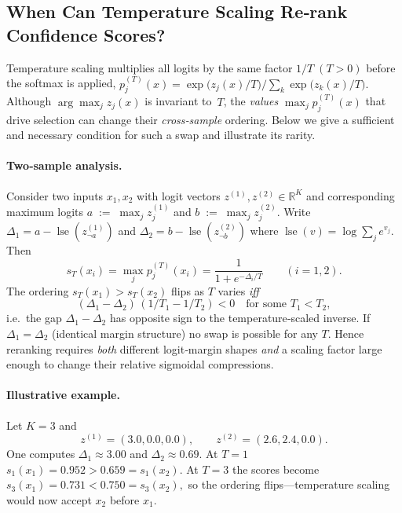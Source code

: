 \subsection{When Can Temperature Scaling Re‑rank Confidence Scores?}
\label{app:ts-rerank}

Temperature scaling multiplies all logits by the same factor
\(1/T\;(T>0)\) before the softmax is applied,
\(
p^{(T)}_j(x)=
\exp\bigl(z_j(x)/T\bigr)\bigl/\sum_k \exp\bigl(z_k(x)/T\bigr).
\)
Although \(\arg\max_j z_j(x)\) is invariant to~\(T\), the \emph{values}
\(\max_j p^{(T)}_j(x)\) that drive selection can change their
\emph{cross‑sample} ordering.  Below we give a sufficient and necessary
condition for such a swap and illustrate its rarity.

\paragraph{Two‑sample analysis.}
Consider two inputs \(x_1,x_2\) with logit vectors
\(z^{(1)},z^{(2)}\in\mathbb{R}^K\) and corresponding maximum logits
\(a\;{:=}\;\max_j z^{(1)}_j\) and \(b\;{:=}\;\max_j z^{(2)}_j\).
Write
\(\Delta_1=a-\operatorname*{lse}(z^{(1)}_{\neg a})\)
and
\(\Delta_2=b-\operatorname*{lse}(z^{(2)}_{\neg b})\)
where
\(\operatorname*{lse}(v)=\log\sum_j e^{v_j}\).
Then
\begin{equation}
  s_T(x_i)=\max_j p^{(T)}_j(x_i)
          =\frac1{1+e^{-\Delta_i/T}}\qquad(i=1,2).
\end{equation}
The ordering \(s_T(x_1)>s_T(x_2)\) flips as \(T\) varies \emph{iff}
\begin{equation}\label{eq:swap-condition}
  (\Delta_1-\Delta_2)\,(1/T_1-1/T_2)<0
  \quad\text{for some }T_1<T_2,
\end{equation}
i.e.\ the gap \(\Delta_1-\Delta_2\) has opposite sign to the
temperature‑scaled inverse.  If
\(\Delta_1=\Delta_2\) (identical margin structure) no swap is possible
for any \(T\).  Hence reranking requires \emph{both} different
logit‑margin shapes \emph{and} a scaling factor large enough to change
their relative sigmoidal compressions.

\paragraph{Illustrative example.}
Let \(K=3\) and
\begin{equation}
z^{(1)}=(3.0,0.0,0.0),\qquad
z^{(2)}=(2.6,2.4,0.0).
\end{equation}
One computes \(\Delta_1\approx 3.00\) and
\(\Delta_2\approx 0.69\).  At \(T=1\)
\(
s_1(x_1)=0.952>0.659=s_1(x_2).
\)
At \(T=3\) the scores become
\(
s_3(x_1)=0.731 < 0.750 = s_3(x_2),
\)
so the ordering flips---temperature scaling would now accept \(x_2\)
before \(x_1\).

